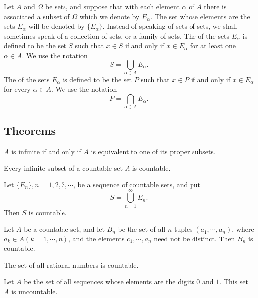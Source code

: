 \begin{deff}
	Let $A$ and $\Omega$ be sets, and suppose that with each element $\alpha$ of $A$ there is associated a subset of $\Omega$ which we denote by $E_\alpha$. The set whose elements are the sets $E_\alpha$ will be denoted by $\{E_\alpha\}$. Instead of speaking of sets of sets, we shall sometimes speak of a collection of sets, or a family of sets. The {} of the sets $E_\alpha$ is defined to be the set $S$ such that $x \in S$ if and only if $x \in E_\alpha$ for at least one $\alpha \in A$. We use the notation $$S = \bigcup\limits_{\alpha \in A} E_\alpha.$$ The {} of the sets $E_\alpha$ is defined to be the set $P$ such that $x \in P$ if and only if $x \in E_\alpha$ for every $\alpha \in A$. We use the notation $$P = \bigcap\limits_{\alpha \in A} E_\alpha.$$
\end{deff}

\subsection{Theorems}
\begin{thm}
	$A$ is infinite if and only if $A$ is equivalent to one of its {\underline{proper subsets}}.
\end{thm}

\begin{thm}
	Every infinite subset of a countable set $A$ is countable.
\end{thm}

\begin{thm}
	Let $\{E_n\}, n = 1, 2, 3, \cdots$, be a sequence of countable sets, and put $$S = \bigcup\limits_{n=1}^\infty E_n.$$ Then $S$ is countable.
\end{thm}

\begin{thm}
	Let $A$ be a countable set, and let $B_n$ be the set of all $n$-tuples $(a_1,\cdots,a_n)$, where $a_k \in A (k = 1, \cdots, n)$, and the elements $a_1, \cdots, a_n$ need not be distinct. Then $B_n$ is countable.
\end{thm}

\begin{cor}
	The set of all rational numbers is countable.
\end{cor}

\begin{thm}
	Let $A$ be the set of all sequences whose elements are the digits $0$ and $1$. This set $A$ is uncountable.
\end{thm}

